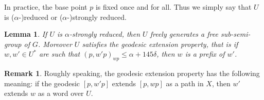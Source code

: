 \documentclass[11pt]{article}
\theoremstyle{plain}
\newtheorem{lem}[thm]{Lemma}
\theoremstyle{definition}
\newtheorem{rem}[thm]{Remark}
\begin{document}
In practice, the base point $p$ is fixed once and for all.
Thus we simply say that $U$ is ($\alpha$-)reduced or ($\alpha$-)strongly reduced.

\begin{lem}
\label{res: free-sub-semigroup}
If $U$ is $\alpha$-strongly reduced, then $U$ freely generates a free sub-semi-group of $G$.
Moreover $U$ satisfies the \emph{geodesic extension property}, that is if $w, w' \in U^*$ are such that $(p, w'p)_{wp} \leq \alpha +145\delta$, then $w$ is a prefix of $w'$.
\end{lem}

\begin{rem}
Roughly speaking, the geodesic extension property has the following meaning: if the geodesic $[p, w'p]$ extends $[p, wp]$ as a path in $X$, then $w'$ extends $w$ as a word over $U$.
\end{rem}
\end{document}

